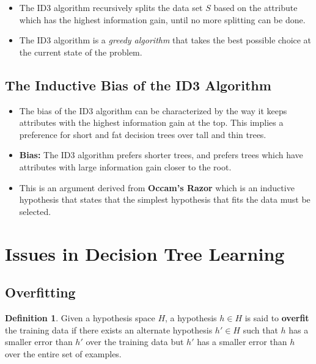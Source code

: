 \documentclass{article}
\theoremstyle{plain}
\theoremstyle{definition}
\newtheorem{defn}{Definition} %
\begin{document}
\begin{itemize}
    \item The ID3 algorithm recursively splits the data set $S$ based on the attribute which has the highest information gain, until no more splitting can be done. 
    
    \item The ID3 algorithm is a \textit{greedy algorithm} that takes the best possible choice at the current state of the problem. 
\end{itemize}

\subsection{The Inductive Bias of the ID3 Algorithm}
\begin{itemize}
    \item The bias of the ID3 algorithm can be characterized by the way it keeps attributes with the highest information gain at the top. This implies a preference for short and fat decision trees over tall and thin trees.
    
    \item \textbf{Bias:} The ID3 algorithm prefers shorter trees, and prefers trees which have attributes with large information gain closer to the root. 
    
    \item This is an argument derived from \textbf{Occam's Razor} which is an inductive hypothesis that states that the simplest hypothesis that fits the data must be selected. 
\end{itemize}

\section{Issues in Decision Tree Learning}
\subsection{Overfitting}
\begin{defn}
    Given a hypothesis space $H$, a hypothesis $h \in H$ is said to \textbf{overfit} the training data if there exists an alternate hypothesis $h' \in H$ such that $h$ has a smaller error than $h'$ over the training data but $h'$ has a smaller error than $h$ over the entire set of examples. 
\end{defn}
\end{document}
